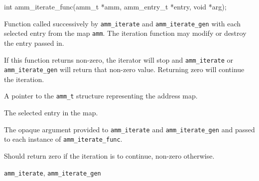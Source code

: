 \begin{apisyn}

	\funcproto int amm_iterate_func(amm_t *amm, amm_entry_t *entry,
			void *arg);
\end{apisyn}
\begin{apidesc}
	Function called successively by {\tt amm_iterate} and
	{\tt amm_iterate_gen} with each selected entry from the map {\tt amm}.
	The iteration function may modify or destroy the entry passed in.

	If this function returns non-zero,
	the iterator will stop and {\tt amm_iterate} or {\tt amm_iterate_gen}
	will return that non-zero value.
	Returning zero will continue the iteration.
\end{apidesc}
\begin{apiparm}
	\item[amm]
		A pointer to the {\tt amm_t} structure
		representing the address map.
	\item[entry]
		The selected entry in the map.
	\item[arg]
		The opaque argument provided to
		{\tt amm_iterate} and {\tt amm_iterate_gen}
		and passed to each instance of {\tt amm_iterate_func}.
\end{apiparm}
\begin{apiret}
	Should return zero if the iteration is to continue,
	non-zero otherwise.
\end{apiret}
\begin{apirel}
	{\tt amm_iterate}, {\tt amm_iterate_gen}
\end{apirel}


